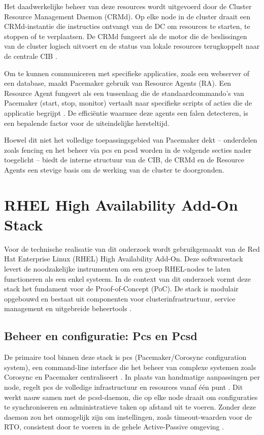 Het daadwerkelijke beheer van deze resources wordt uitgevoerd door de Cluster Resource Management Daemon (CRMd). Op elke node in de cluster draait een CRMd-instantie die instructies ontvangt van de DC om resources te starten, te stoppen of te verplaatsen. De CRMd fungeert als de motor die de beslissingen van de cluster logisch uitvoert en de status van lokale resources terugkoppelt naar de centrale CIB \autocite{ClusterLabs2}.
\medskip

Om te kunnen communiceren met specifieke applicaties, zoals een webserver of een database, maakt Pacemaker gebruik van Resource Agents (RA). Een Resource Agent fungeert als een tussenlaag die de standaardcommando's van Pacemaker (start, stop, monitor) vertaalt naar specifieke scripts of acties die de applicatie begrijpt \autocite{ClusterLabs2}. De efficiëntie waarmee deze agents een falen detecteren, is een bepalende factor voor de uiteindelijke hersteltijd.
\medskip

Hoewel dit niet het volledige toepassingsgebied van Pacemaker dekt – onderdelen zoals fencing en het beheer via pcs en pcsd worden in de volgende secties nader toegelicht – biedt de interne structuur van de CIB, de CRMd en de Resource Agents een stevige basis om de werking van de cluster te doorgronden.

\section{RHEL High Availability Add-On Stack}
Voor de technische realisatie van dit onderzoek wordt gebruikgemaakt van de Red Hat Enterprise Linux (RHEL) High Availability Add-On. Deze softwarestack levert de noodzakelijke instrumenten om een groep RHEL-nodes te laten functioneren als een enkel systeem. In de context van dit onderzoek vormt deze stack het fundament voor de Proof-of-Concept (PoC). De stack is modulair opgebouwd en bestaat uit componenten voor clusterinfrastructuur, service management en uitgebreide beheertools \autocite{RedHat}.

\subsection{Beheer en configuratie: Pcs en Pcsd}
De primaire tool binnen deze stack is pcs (Pacemaker/Corosync configuration system), een command-line interface die het beheer van complexe systemen zoals Corosync en Pacemaker centraliseert \autocite{ClusterLabs2026}. In plaats van handmatige aanpassingen per node, regelt pcs de volledige infrastructuur en resources vanaf één punt \autocite{RedHat}. Dit werkt nauw samen met de pcsd-daemon, die op elke node draait om configuraties te synchroniseren en administratieve taken op afstand uit te voeren. Zonder deze daemon zou het onmogelijk zijn om instellingen, zoals timeout-waarden voor de RTO, consistent door te voeren in de gehele Active-Passive omgeving \autocite{Oracle}.
\medskip

